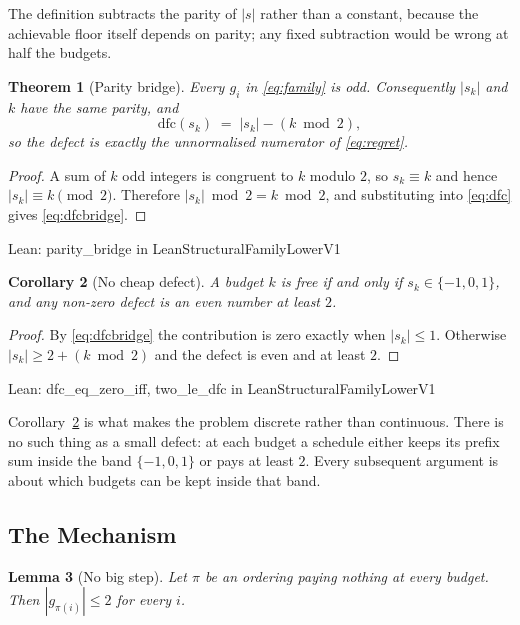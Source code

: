 \documentclass[conference]{IEEEtran}
\newtheorem{theorem}{Theorem}
\newtheorem{lemma}[theorem]{Lemma}
\newtheorem{corollary}[theorem]{Corollary}
\theoremstyle{definition}
\newcommand{\lean}[1]{\textsf{\footnotesize #1}}
\newcommand{\leanbox}[1]{%
  \par\vspace{2pt}\noindent
  {\footnotesize\textsf{Lean: #1}}\par\vspace{2pt}}
\begin{document}
The definition subtracts the parity of $|s|$ rather than a constant, because the achievable
floor itself depends on parity; any fixed subtraction would be wrong at half the budgets.

\begin{theorem}[Parity bridge]
\label{thm:parity}
Every $g_{i}$ in \eqref{eq:family} is odd. Consequently $|s_{k}|$ and $k$ have the same
parity, and
\begin{equation}
\mathrm{dfc}(s_{k})\;=\;|s_{k}|-(k\bmod2),
\label{eq:dfcbridge}
\end{equation}
so the defect is exactly the unnormalised numerator of \eqref{eq:regret}.
\end{theorem}

\begin{proof}
A sum of $k$ odd integers is congruent to $k$ modulo $2$, so $s_{k}\equiv k$ and hence
$|s_{k}|\equiv k \pmod 2$. Therefore $|s_{k}|\bmod2=k\bmod2$, and substituting into
\eqref{eq:dfc} gives \eqref{eq:dfcbridge}.
\end{proof}

\leanbox{\lean{parity\_bridge} in \lean{LeanStructuralFamilyLowerV1}}

\begin{corollary}[No cheap defect]
\label{cor:nocheap}
A budget $k$ is free if and only if $s_{k}\in\{-1,0,1\}$, and any non-zero defect is an even
number at least $2$.
\end{corollary}

\begin{proof}
By \eqref{eq:dfcbridge} the contribution is zero exactly when $|s_{k}|\le1$. Otherwise
$|s_{k}|\ge2+(k\bmod2)$ and the defect is even and at least $2$.
\end{proof}

\leanbox{\lean{dfc\_eq\_zero\_iff}, \lean{two\_le\_dfc} in
\lean{LeanStructuralFamilyLowerV1}}

Corollary~\ref{cor:nocheap} is what makes the problem discrete rather than continuous. There
is no such thing as a small defect: at each budget a schedule either keeps its prefix sum
inside the band $\{-1,0,1\}$ or pays at least $2$. Every subsequent argument is about which
budgets can be kept inside that band.

\subsection{The Mechanism}
\label{sec:mechanism}

\begin{lemma}[No big step]
\label{lem:nobigstep}
Let $\pi$ be an ordering paying nothing at every budget. Then $|g_{\pi(i)}|\le2$ for every
$i$.
\end{lemma}
\end{document}
